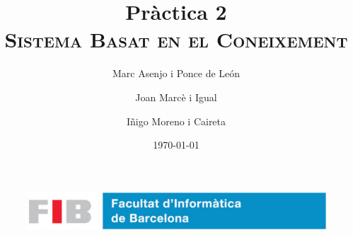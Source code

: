 \documentclass[a4paper, 12pt, UTF8]{article}
\title{
	\Huge
	\textbf{Pràctica 2} \\ 
	\scshape Sistema Basat en el Coneixement
	}
\author{
	Marc Asenjo i Ponce de León \and
	Joan Marcè i Igual \and
	Iñigo Moreno i Caireta
	}
\date{\today}
\begin{document}
\maketitle

\begin{figure}
	\centering
	\includegraphics[width=\linewidth]{./simple_FIB}
\end{figure}

\newpage
\tableofcontents
\end{document}
